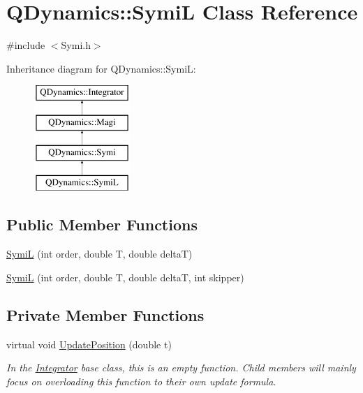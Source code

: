 \hypertarget{classQDynamics_1_1SymiL}{}\section{Q\+Dynamics\+:\+:SymiL Class Reference}
\label{classQDynamics_1_1SymiL}


{\ttfamily \#include $<$Symi.\+h$>$}

Inheritance diagram for Q\+Dynamics\+:\+:SymiL\+:\begin{figure}[H]
\begin{center}
\leavevmode
\includegraphics[height=4.000000cm]{classQDynamics_1_1SymiL}
\end{center}
\end{figure}
\subsection*{Public Member Functions}
\begin{DoxyCompactItemize}
\item 
\hyperlink{classQDynamics_1_1SymiL_ac220b2a8cccf6c3c8ca0d0f79c094fe7}{SymiL} (int order, double T, double deltaT)
\item 
\hyperlink{classQDynamics_1_1SymiL_acdb13fb6bc527f687385dbdb05ff6e17}{SymiL} (int order, double T, double deltaT, int skipper)
\end{DoxyCompactItemize}
\subsection*{Private Member Functions}
\begin{DoxyCompactItemize}
\item 
virtual void \hyperlink{classQDynamics_1_1SymiL_a28d23793abeb8f40c9d9ec069d67debb}{Update\+Position} (double t)
\begin{DoxyCompactList}\small\item\em In the \hyperlink{classQDynamics_1_1Integrator}{Integrator} base class, this is an empty function. Child members will mainly focus on overloading this function to their own update formula. \end{DoxyCompactList}\end{DoxyCompactItemize}

